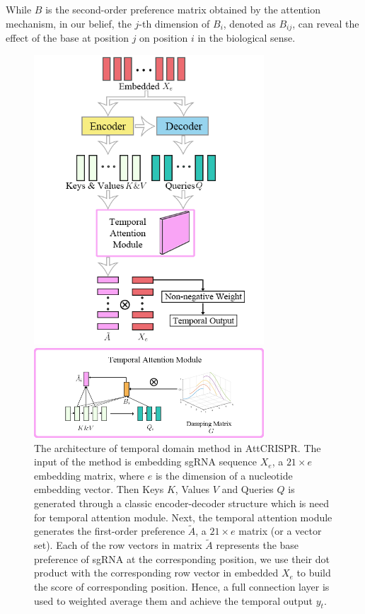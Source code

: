 \documentclass{bioinfo}
\begin{document}
While $B$ is the second-order preference matrix obtained by the attention mechanism, in our belief, the $j$-th dimension of $B_i$, denoted as $B_{ij}$, can reveal the effect of the base at position $j$ on position $i$ in the biological sense. 
\begin{figure}[!tpb]%
    \centerline{\includegraphics[width=86mm]{temporalmodule.png}}
    \caption{The architecture of temporal domain method in AttCRISPR. 
    The input of the method is embedding sgRNA sequence $X_e$, a $21\times e$ embedding matrix, where $e$ is the dimension of a nucleotide embedding vector. 
    Then Keys $K$, Values $V$ and Queries $Q$ is generated through a classic encoder-decoder structure which is need for temporal attention module.
    Next, the temporal attention module generates the first-order preference $\tilde{A}$, a $21\times e$ matrix (or a vector set). 
    Each of the row vectors in matrix $\tilde{A}$ represents the base preference of sgRNA at the corresponding position, we use their dot product with the corresponding row vector in embedded $X_e$ to build the score of corresponding position. 
    Hence, a full connection layer is used to weighted average them and achieve the temporal output $y_t$.
    }\label{fig:04}
\centerline{\includegraphics[width=86mm]{temporalattentionmodule.png}}

\end{figure}
\end{document}

